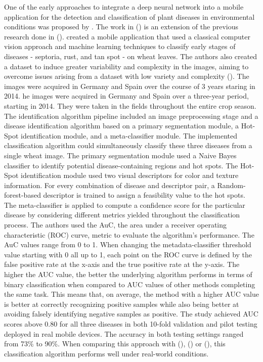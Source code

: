 \documentclass{BachelorBUI}
\begin{document}
One of the early approaches to integrate a deep neural network into a mobile application for the detection and classification of plant diseases in environmental conditions was proposed by \cite{Picon:2019}. The work in (\cite{Picon:2019}) is an extension of the previous research done in (\cite{Johannes:2017}). \textcite{Johannes:2017} created a mobile application that used a classical computer vision approach and machine learning techniques to classify early stages of diseases - septoria, rust, and tan spot - on wheat leaves. The authors also created a dataset to induce greater variability and complexity in the images, aiming to overcome issues arising from a dataset with low variety and complexity (\cite{Mohanty:2016,Ferentinos:2018}). The images were acquired in Germany and Spain over the course of 3 years staring in 2014. he images were acquired in Germany and Spain over a three-year period, starting in 2014. They were taken in the fields throughout the entire crop season. The identification algorithm pipeline included an image preprocessing stage and a disease identification algorithm based on a primary segmentation module, a Hot-Spot identification module, and a meta-classifier module. The implemented classification algorithm could simultaneously classify these three diseases from a single wheat image. The primary segmentation module used a Naive Bayes classifier to identify potential disease-containing regions and hot spots. The Hot-Spot identification module used two visual descriptors for color and texture information. For every combination of disease and descriptor pair, a Random-forest-based descriptor is trained to assign a feasibility value to the hot spots. The meta-classifier is applied to compute a confidence score for the particular disease by considering different metrics yielded throughout the classification process. The authors used the AuC, the area under a receiver operating characteristic (ROC) curve, metric to evaluate the algorithm's performance. The AuC values range from 0 to 1. When changing the metadata-classifier threshold value starting with 0 all up to 1, each point on the ROC curve is defined by the false positive rate at the x-axis and the true positive rate at the y-axis. The higher the AUC value, the better the underlying algorithm performs in terms of binary classification when compared to AUC values of other methods completing the same task. This means that, on average, the method with a higher AUC value is better at correctly recognizing positive samples while also being better at avoiding falsely identifying negative samples as positive. The study achieved AUC scores above 0.80 for all three diseases in both 10-fold validation and pilot testing deployed in real mobile devices. The accuracy in both testing settings ranged from 73\% to 90\%. When comparing this approach with (\cite{Sladojevic:2016}), (\cite{Mohanty:2016}) or (\cite{Ferentinos:2018}), this classification algorithm performs well under real-world conditions.
\end{document}
